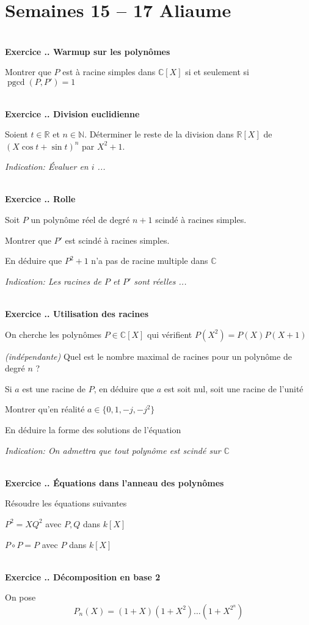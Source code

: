 \documentclass{article}
\newcommand{\mb}[1]{\mathbb{#1}}
\newcounter{exo}
\newcommand{\exercice}[1][\null]{\textbf{\\ Exercice \thesection.\theexo. #1} \addtocounter{exo}{1}}
\newcommand{\indication}[1]{\begin{flushright}\textit{Indication: #1}\end{flushright}}
\begin{document}
\section{Semaines 15 -- 17 Aliaume}

\exercice[Warmup sur les polynômes]
Montrer que $P$ est à racine simples
dans $\mb{C}[X]$ si et seulement si 
$\operatorname{pgcd} (P,P') = 1$


\exercice[Division euclidienne]
Soient $t \in \mb{R}$ et $n \in \mb{N}$.
Déterminer le reste de la division 
dans $\mb{R}[X]$ de $(X \cos t + \sin t)^n$
par $X^2 + 1$.

\indication{Évaluer en $i$ ...}


\exercice[Rolle]
Soit $P$ un polynôme réel de degré $n+1$
scindé à racines simples. 

\begin{compactenum}[(i)]
\item Montrer que $P'$ est scindé à racines simples.
\item En déduire que $P^2 + 1$
    n'a pas de racine multiple 
    dans $\mb{C}$ 
    \indication{Les racines de $P$
    et $P'$ sont réelles ...}
\end{compactenum}


\exercice[Utilisation des racines]
On cherche les polynômes $P \in \mb{C}[X]$ 
qui vérifient $P(X^2) = P(X)P(X+1)$
\begin{compactenum}[(i)]
\item \emph{(indépendante)} Quel 
    est le nombre maximal de racines 
    pour un polynôme de degré $n$ ?
\item Si $a$ est une racine de $P$,
    en déduire que $a$ est soit nul, 
    soit une racine de l'unité
\item Montrer qu'en réalité $a \in \{ 0, 1, -j, -j^2\}$
\item En déduire la forme des solutions de l'équation 
    \indication{On admettra que tout 
        polynôme est scindé sur $\mb{C}$}
\end{compactenum}


\exercice[Équations dans l'anneau des polynômes]
Résoudre les équations suivantes
\begin{compactenum}[(i)]
\item $P^2 = X Q^2$ avec $P,Q$ dans $k[X]$
\item $P \circ P = P$ avec $P$ dans $k[X]$
\end{compactenum}


\exercice[Décomposition en base 2]
On pose 
\begin{equation*}
    P_n(X) = (1+X)(1+X^2) \dots (1 + X^{2^n})
\end{equation*}
\end{document}
